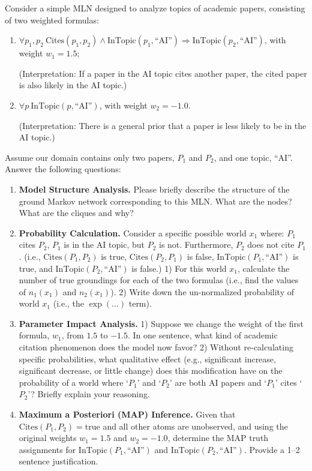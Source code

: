 \documentclass[11pt,a4paper]{article}
\begin{document}
Consider a simple MLN designed to analyze topics of academic papers, consisting of two weighted formulas:
\begin{enumerate}[label=(\alph*)]
    \item $\forall p_1, p_2\ \mathrm{Cites}(p_1, p_2) \land \mathrm{InTopic}(p_1, \text{``AI''}) \Rightarrow \mathrm{InTopic}(p_2, \text{``AI''})$, with weight $w_1 = 1.5$;

    (Interpretation: If a paper in the AI topic cites another paper, the cited paper is also likely in the AI topic.)
    \item $\forall p\ \mathrm{InTopic}(p, \text{``AI''})$, with weight $w_2 = -1.0$.

    (Interpretation: There is a general prior that a paper is less likely to be in the AI topic.)
\end{enumerate}
Assume our domain contains only two papers, $P_1$ and $P_2$, and one topic, ``AI''.
Answer the following questions:
\begin{enumerate}[label=(\alph*)]
    \item \textbf{Model Structure Analysis.} Please briefly describe the structure of the ground Markov network corresponding to this MLN. What are the nodes? What are the cliques and why?
    \item \textbf{Probability Calculation.} Consider a specific possible world $x_1$ where: $P_1$ cites $P_2$, $P_1$ is in the AI topic, but $P_2$ is not. Furthermore, $P_2$ does not cite $P_1$. (i.e., $\mathrm{Cites}(P_1, P_2)$ is true, $\mathrm{Cites}(P_2, P_1)$ is false, $\mathrm{InTopic}(P_1, \text{``AI''})$ is true, and $\mathrm{InTopic}(P_2, \text{``AI''})$ is false.) 1) For this world $x_1$, calculate the number of true groundings for each of the two formulas (i.e., find the values of $n_1(x_1)$ and $n_2(x_1)$). 2) Write down the un-normalized probability of world $x_1$ (i.e., the $\exp(\dots)$ term).
    \item \textbf{Parameter Impact Analysis.} 1) Suppose we change the weight of the first formula, $w_1$, from $1.5$ to $-1.5$. In one sentence, what kind of academic citation phenomenon does the model now favor? 2) Without re-calculating specific probabilities, what qualitative effect (e.g., significant increase, significant decrease, or little change) does this modification have on the probability of a world where `$P_1$' and `$P_2$' are both AI papers and `$P_1$' cites `$P_2$'? Briefly explain your reasoning.
    \item \textbf{Maximum a Posteriori (MAP) Inference.} Given that $\mathrm{Cites}(P_1, P_2) = \mathrm{true}$ and all other atoms are unobserved, and using the original weights $w_1 = 1.5$ and $w_2 = -1.0$, determine the MAP truth assignments for $\mathrm{InTopic}(P_1, \text{``AI''})$ and $\mathrm{InTopic}(P_2, \text{``AI''})$. Provide a 1--2 sentence justification.
\end{enumerate}
\end{document}
